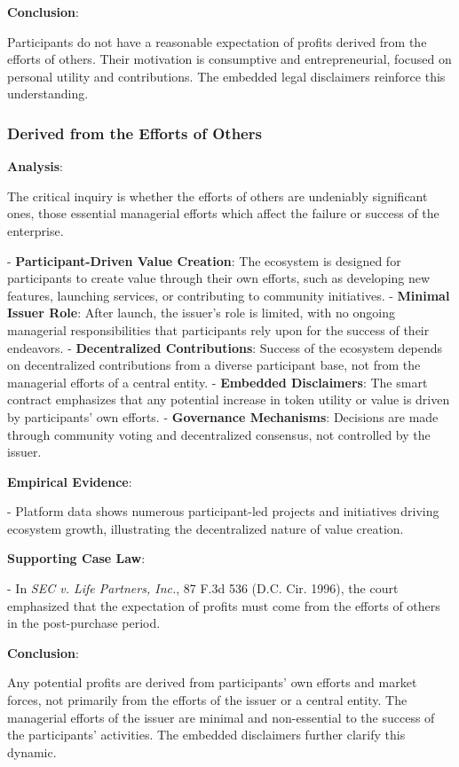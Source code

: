 \documentclass[a4paper,12pt]{article}
\begin{document}
\textbf{Conclusion}:

Participants do not have a reasonable expectation of profits derived from the efforts of others. Their motivation is consumptive and entrepreneurial, focused on personal utility and contributions. The embedded legal disclaimers reinforce this understanding.

\subsubsection{Derived from the Efforts of Others}
\textbf{Analysis}:

The critical inquiry is whether the efforts of others are undeniably significant ones, those essential managerial efforts which affect the failure or success of the enterprise.

- \textbf{Participant-Driven Value Creation}: The ecosystem is designed for participants to create value through their own efforts, such as developing new features, launching services, or contributing to community initiatives.
- \textbf{Minimal Issuer Role}: After launch, the issuer's role is limited, with no ongoing managerial responsibilities that participants rely upon for the success of their endeavors.
- \textbf{Decentralized Contributions}: Success of the ecosystem depends on decentralized contributions from a diverse participant base, not from the managerial efforts of a central entity.
- \textbf{Embedded Disclaimers}: The smart contract emphasizes that any potential increase in token utility or value is driven by participants' own efforts.
- \textbf{Governance Mechanisms}: Decisions are made through community voting and decentralized consensus, not controlled by the issuer.

\textbf{Empirical Evidence}:

- Platform data shows numerous participant-led projects and initiatives driving ecosystem growth, illustrating the decentralized nature of value creation.

\textbf{Supporting Case Law}:

- In \emph{SEC v. Life Partners, Inc.}, 87 F.3d 536 (D.C. Cir. 1996), the court emphasized that the expectation of profits must come from the efforts of others in the post-purchase period.

\textbf{Conclusion}:

Any potential profits are derived from participants' own efforts and market forces, not primarily from the efforts of the issuer or a central entity. The managerial efforts of the issuer are minimal and non-essential to the success of the participants' activities. The embedded disclaimers further clarify this dynamic.
\end{document}
